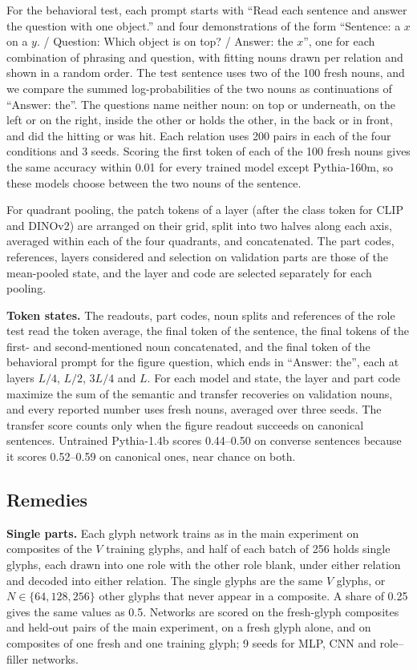 \documentclass[10pt]{article}
\theoremstyle{plain}
\theoremstyle{remark}
\begin{document}
For the behavioral test, each prompt starts with ``Read each sentence and answer the question with one object.'' and four demonstrations of the form ``Sentence: a $x$ on a $y$. / Question: Which object is on top? / Answer: the $x$'', one for each combination of phrasing and question, with fitting nouns drawn per relation and shown in a random order. The test sentence uses two of the 100 fresh nouns, and we compare the summed log-probabilities of the two nouns as continuations of ``Answer: the''. The questions name neither noun: on top or underneath, on the left or on the right, inside the other or holds the other, in the back or in front, and did the hitting or was hit. Each relation uses 200 pairs in each of the four conditions and 3 seeds. Scoring the first token of each of the 100 fresh nouns gives the same accuracy within 0.01 for every trained model except Pythia-160m, so these models choose between the two nouns of the sentence.

For quadrant pooling, the patch tokens of a layer (after the class token for CLIP and DINOv2) are arranged on their grid, split into two halves along each axis, averaged within each of the four quadrants, and concatenated. The part codes, references, layers considered and selection on validation parts are those of the mean-pooled state, and the layer and code are selected separately for each pooling.

\textbf{Token states.}\label{app:e11} The readouts, part codes, noun splits and references of the role test read the token average, the final token of the sentence, the final tokens of the first- and second-mentioned noun concatenated, and the final token of the behavioral prompt for the figure question, which ends in ``Answer: the'', each at layers $L/4$, $L/2$, $3L/4$ and $L$. For each model and state, the layer and part code maximize the sum of the semantic and transfer recoveries on validation nouns, and every reported number uses fresh nouns, averaged over three seeds. The transfer score counts only when the figure readout succeeds on canonical sentences. Untrained Pythia-1.4b scores 0.44--0.50 on converse sentences because it scores 0.52--0.59 on canonical ones, near chance on both.

\subsection{Remedies}
\label{app:remedies}

\textbf{Single parts.} Each glyph network trains as in the main experiment on composites of the $V$ training glyphs, and half of each batch of 256 holds single glyphs, each drawn into one role with the other role blank, under either relation and decoded into either relation. The single glyphs are the same $V$ glyphs, or $N \in \{64, 128, 256\}$ other glyphs that never appear in a composite. A share of 0.25 gives the same values as 0.5. Networks are scored on the fresh-glyph composites and held-out pairs of the main experiment, on a fresh glyph alone, and on composites of one fresh and one training glyph; 9 seeds for MLP, CNN and role--filler networks.
\end{document}
